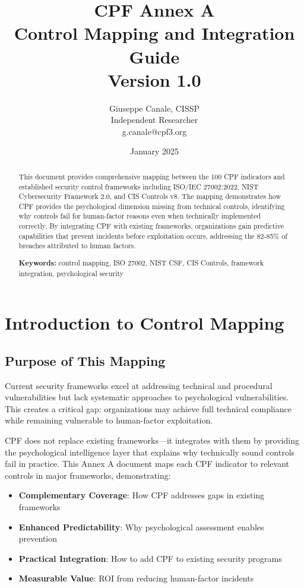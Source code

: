 \documentclass[11pt,a4paper]{article}
\title{\textbf{CPF Annex A}\\
\large Control Mapping and Integration Guide\\
\large Version 1.0}
\author{Giuseppe Canale, CISSP\\
\small Independent Researcher\\
\small g.canale@cpf3.org}
\date{January 2025}
\begin{document}
\maketitle

\begin{abstract}
This document provides comprehensive mapping between the 100 CPF indicators and established security control frameworks including ISO/IEC 27002:2022, NIST Cybersecurity Framework 2.0, and CIS Controls v8. The mapping demonstrates how CPF provides the psychological dimension missing from technical controls, identifying why controls fail for human-factor reasons even when technically implemented correctly. By integrating CPF with existing frameworks, organizations gain predictive capabilities that prevent incidents before exploitation occurs, addressing the 82-85\% of breaches attributed to human factors.

\textbf{Keywords:} control mapping, ISO 27002, NIST CSF, CIS Controls, framework integration, psychological security
\end{abstract}

\tableofcontents
\newpage

\section{Introduction to Control Mapping}

\subsection{Purpose of This Mapping}

Current security frameworks excel at addressing technical and procedural vulnerabilities but lack systematic approaches to psychological vulnerabilities. This creates a critical gap: organizations may achieve full technical compliance while remaining vulnerable to human-factor exploitation.

CPF does not replace existing frameworks---it integrates with them by providing the psychological intelligence layer that explains why technically sound controls fail in practice. This Annex A document maps each CPF indicator to relevant controls in major frameworks, demonstrating:

\begin{itemize}
\item \textbf{Complementary Coverage}: How CPF addresses gaps in existing frameworks
\item \textbf{Enhanced Predictability}: Why psychological assessment enables prevention
\item \textbf{Practical Integration}: How to add CPF to existing security programs
\item \textbf{Measurable Value}: ROI from reducing human-factor incidents
\end{itemize}
\end{document}
